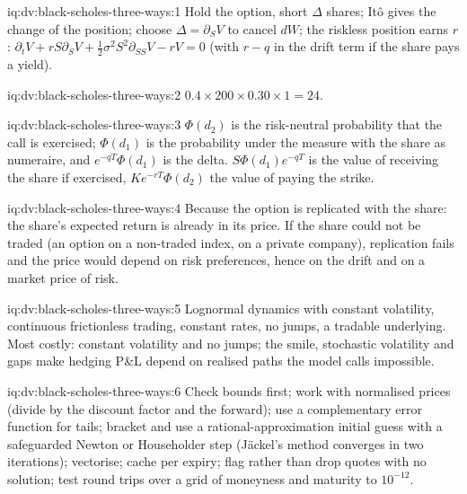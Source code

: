\begin{solution}{iq:dv:black-scholes-three-ways:1}
Hold the option, short $\Delta$ shares; Itô gives the change of the position; choose
$\Delta=\partial_SV$ to cancel $dW$; the riskless position earns $r$:
$\partial_tV+rS\partial_SV+\tfrac12\sigma^2S^2\partial_{SS}V-rV=0$ (with $r-q$ in the
drift term if the share pays a yield).
\end{solution}

\begin{solution}{iq:dv:black-scholes-three-ways:2}
$0.4\times200\times0.30\times1=24$.
\end{solution}

\begin{solution}{iq:dv:black-scholes-three-ways:3}
$\Phi(d_2)$ is the risk-neutral probability that the call is exercised;
$\Phi(d_1)$ is the probability under the measure with the share as numeraire, and
$e^{-qT}\Phi(d_1)$ is the delta. $S\Phi(d_1)e^{-qT}$ is the value of receiving the
share if exercised, $Ke^{-rT}\Phi(d_2)$ the value of paying the strike.
\end{solution}

\begin{solution}{iq:dv:black-scholes-three-ways:4}
Because the option is replicated with the share: the share's expected return is
already in its price. If the share could not be traded (an option on a
non-traded index, on a private company), replication fails and the price would
depend on risk preferences, hence on the drift and on a market price of risk.
\end{solution}

\begin{solution}{iq:dv:black-scholes-three-ways:5}
Lognormal dynamics with constant volatility, continuous frictionless trading,
constant rates, no jumps, a tradable underlying. Most costly: constant volatility
and no jumps; the smile, stochastic volatility and gaps make hedging P\&L depend
on realised paths the model calls impossible.
\end{solution}

\begin{solution}{iq:dv:black-scholes-three-ways:6}
Check bounds first; work with normalised prices (divide by the discount factor and
the forward); use a complementary error function for tails; bracket and use a
rational-approximation initial guess with a safeguarded Newton or Householder step
(Jäckel's method converges in two iterations); vectorise; cache per expiry;
flag rather than drop quotes with no solution; test round trips over a grid of
moneyness and maturity to $10^{-12}$.
\end{solution}
